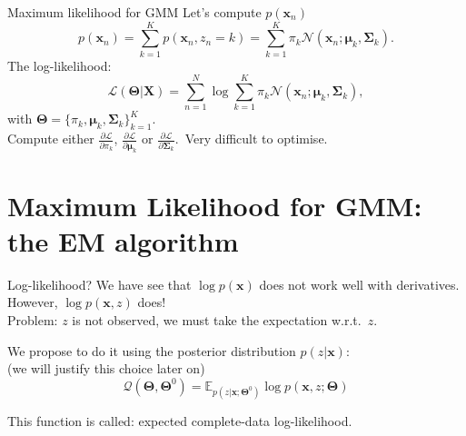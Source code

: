 \documentclass{beamer}
\newcommand{\bs}[1]{\boldsymbol{#1}}
\begin{document}
\begin{frame}{Maximum likelihood for GMM}
 Let's compute $p(\bs{x}_n)$
 \[ p(\bs{x}_n) = \sum_{k=1}^K p(\bs{x}_n,z_n=k) = \sum_{k=1}^K \pi_k\mathcal{N}(\bs{x}_n;\bs{\mu}_k,\bs{\Sigma}_k).\]
 The log-likelihood:
 \[\mathcal{L}(\bs{\Theta}|\bs{X}) = \sum_{n=1}^N \log  \sum_{k=1}^K \pi_k\mathcal{N}(\bs{x}_n;\bs{\mu}_k,\bs{\Sigma}_k),\]
 {\small with $\bs{\Theta}=\{\pi_k,\bs{\mu}_k,\bs{\Sigma}_k\}_{k=1}^K$.}\vspace{5mm}\\
 Compute either $\displaystyle\frac{\partial\mathcal{L}}{\partial\pi_k}$, $\displaystyle\frac{\partial\mathcal{L}}{\partial\bs{\mu}_k}$ or $\displaystyle\frac{\partial\mathcal{L}}{\partial\bs{\Sigma}_k}$.\pause\ Very difficult to optimise.
\end{frame}

\section{Maximum Likelihood for GMM: the EM algorithm}

\begin{frame}{Log-likelihood?}
 We have see that $\log p(\bs{x})$ does not work well with derivatives.\vspace{3mm}\\
 
 However, $\log p(\bs{x},z)$ does!\vspace{3mm}\\
 
 Problem: $z$ is not observed, we must take the expectation w.r.t.\ $z$.\vspace{3mm}\\
 \vspace{3mm}\pause

 We propose to do it using the posterior distribution $p(z|\bs{x})$:\\
 {\small (we will justify this choice later on)}
 \[\mathcal{Q}(\bs{\Theta},\bs{\Theta}^0) = \mathbb{E}_{p(z|\bs{x};\bs{\Theta}^0)} \log p(\bs{x},z;\bs{\Theta})\]
 
 This function is called: expected complete-data log-likelihood.
\end{frame}
\end{document}
